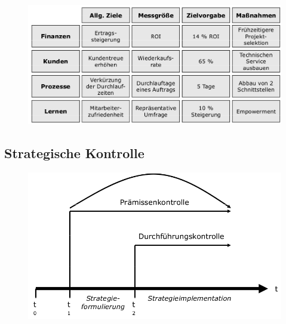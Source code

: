 \documentclass[a4paper,11pt, twoside]{article}
\begin{document}
\begin{figure}[h]
 \begin{center}
   \includegraphics[scale=0.2]{bilder/strategische_balancedscorecard2.png}
 \end{center}
\end{figure}

\subsection{Strategische Kontrolle}

\begin{figure}[h]
 \begin{center}
   \includegraphics[scale=0.2]{bilder/strategische_kontrolle1.png}
 \end{center}
\end{figure}
\end{document}
